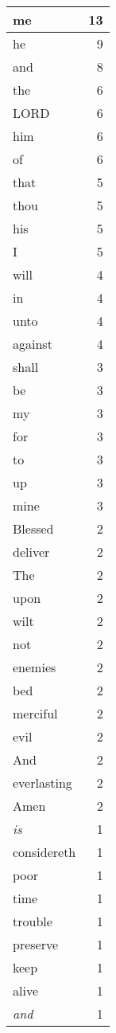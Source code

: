 \begin{center}
\begin{longtable}{l|r}
\hline \hline
\endlastfoot
me & 13 \\ \hline
he & 9 \\ \hline
and & 8 \\ \hline
the & 6 \\ \hline
LORD & 6 \\ \hline
him & 6 \\ \hline
of & 6 \\ \hline
that & 5 \\ \hline
thou & 5 \\ \hline
his & 5 \\ \hline
I & 5 \\ \hline
will & 4 \\ \hline
in & 4 \\ \hline
unto & 4 \\ \hline
against & 4 \\ \hline
shall & 3 \\ \hline
be & 3 \\ \hline
my & 3 \\ \hline
for & 3 \\ \hline
to & 3 \\ \hline
up & 3 \\ \hline
mine & 3 \\ \hline
Blessed & 2 \\ \hline
deliver & 2 \\ \hline
The & 2 \\ \hline
upon & 2 \\ \hline
wilt & 2 \\ \hline
not & 2 \\ \hline
enemies & 2 \\ \hline
bed & 2 \\ \hline
merciful & 2 \\ \hline
evil & 2 \\ \hline
And & 2 \\ \hline
everlasting & 2 \\ \hline
Amen & 2 \\ \hline
\emph{is} & 1 \\ \hline
considereth & 1 \\ \hline
poor & 1 \\ \hline
time & 1 \\ \hline
trouble & 1 \\ \hline
preserve & 1 \\ \hline
keep & 1 \\ \hline
alive & 1 \\ \hline
\emph{and} & 1 \\ \hline

\end{longtable}
\end{center}
